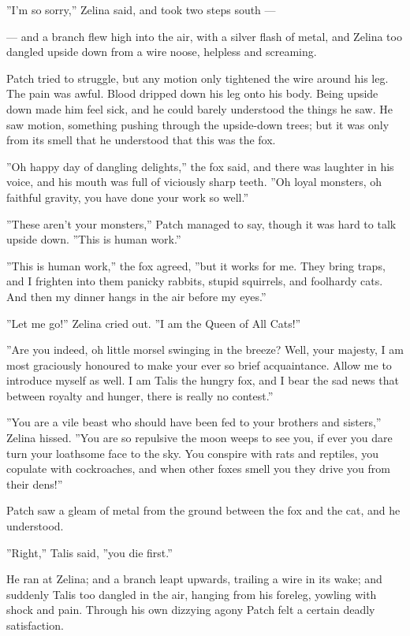 \documentclass[12pt]{book}
\begin{document}
''I'm so sorry,'' Zelina said, and took two steps south ---

--- and a branch flew high into the air, with a silver flash of metal,
and Zelina too dangled upside down from a wire noose, helpless and
screaming.

Patch tried to struggle, but any motion only tightened the wire around
his leg. The pain was awful. Blood dripped down his leg onto his
body. Being upside down made him feel sick, and he could barely
understood the things he saw. He saw motion, something pushing through
the upside-down trees; but it was only from its smell that he
understood that this was the fox.

''Oh happy day of dangling delights,'' the fox said, and there was
laughter in his voice, and his mouth was full of viciously sharp
teeth. ''Oh loyal monsters, oh faithful gravity, you have done your
work so well.''

''These aren't your monsters,'' Patch managed to say, though it was
hard to talk upside down. ''This is human work.''

''This is human work,'' the fox agreed, ''but it works for me. They
bring traps, and I frighten into them panicky rabbits, stupid
squirrels, and foolhardy cats. And then my dinner hangs in the air
before my eyes.''

''Let me go!'' Zelina cried out. ''I am the Queen of All Cats!''

''Are you indeed, oh little morsel swinging in the breeze? Well, your
majesty, I am most graciously honoured to make your ever so brief
acquaintance. Allow me to introduce myself as well. I am Talis the
hungry fox, and I bear the sad news that between royalty and hunger,
there is really no contest.''

''You are a vile beast who should have been fed to your brothers and
sisters,'' Zelina hissed. ''You are so repulsive the moon weeps to see
you, if ever you dare turn your loathsome face to the sky. You
conspire with rats and reptiles, you copulate with cockroaches, and
when other foxes smell you they drive you from their dens!''

Patch saw a gleam of metal from the ground between the fox and the
cat, and he understood.

''Right,'' Talis said, ''you die first.''

He ran at Zelina; and a branch leapt upwards, trailing a wire in its
wake; and suddenly Talis too dangled in the air, hanging from his
foreleg, yowling with shock and pain. Through his own dizzying agony
Patch felt a certain deadly satisfaction.
\end{document}
